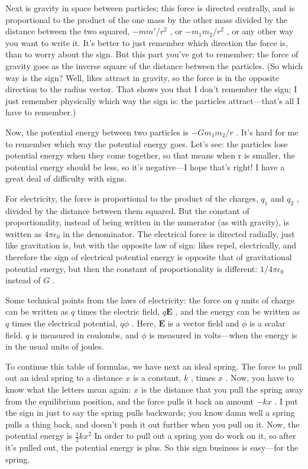 \documentclass[11pt,oneside]{article}
\providecommand{\FLPE}{\mathbf{E}}
\begin{document}
Next is gravity in space between particles; this force is directed centrally, and is proportional to the product of the one mass by the other mass divided by the distance between the two squared, \(-mm'/r^2\) , or \(-m_1m_2/r^2\) , or any other way you want to write it. It's better to just remember which direction the force is, than to worry about the sign. But this part you've got to remember: the force of gravity goes as the inverse square of the distance between the particles. (So which way is the sign? Well, likes attract in gravity, so the force is in the opposite direction to the radius vector. That shows you that I don't remember the sign; I just remember physically which way the sign is: the particles attract---that's all I have to remember.)\par

Now, the potential energy between two particles is \(-Gm_1m_2/r\) . It's hard for me to remember which way the potential energy goes. Let's see: the particles lose potential energy when they come together, so that means when r is smaller, the potential energy should be less, so it's negative---I hope that's right! I have a great deal of difficulty with signs.\par

For electricity, the force is proportional to the product of the charges, \(q_1\) and \(q_2\) , divided by the distance between them squared. But the constant of proportionality, instead of being written in the numerator (as with gravity), is written as \(4\pi\epsilon_0\) in the denominator. The electrical force is directed radially, just like gravitation is, but with the opposite law of sign: likes repel, electrically, and therefore the sign of electrical potential energy is opposite that of gravitational potential energy, but then the constant of proportionality is different: \(1/4\pi\epsilon_0\) instead of \(G\) .\par

Some technical points from the laws of electricity: the force on \(q\) units of charge can be written as \(q\) times the electric field, \(q\FLPE\) , and the energy can be written as \(q\) times the electrical potential, \(q\phi\) . Here, \(\FLPE\) is a vector field and \(\phi\) is a scalar field. \(q\) is measured in coulombs, and \(\phi\) is measured in volts---when the energy is in the usual units of joules.\par

To continue this table of formulas, we have next an ideal spring. The force to pull out an ideal spring to a distance \(x\) is a constant, \(k\) , times \(x\) . Now, you have to know what the letters mean again: \(x\) is the distance that you pull the spring away from the equilibrium position, and the force pulls it back an amount \(-kx\) . I put the sign in just to say the spring pulls backwards; you know damn well a spring pulls a thing back, and doesn't push it out further when you pull on it. Now, the potential energy is \(\frac12kx^2\) In order to pull out a spring you do work on it, so after it's pulled out, the potential energy is plus. So this sign business is easy---for the spring.\par
\end{document}
